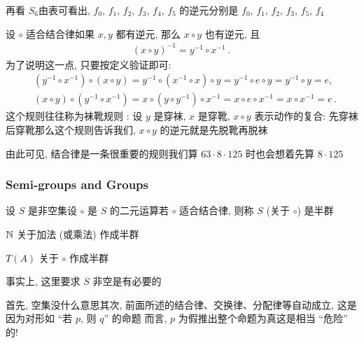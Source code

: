 \begin{example}
    再看 $S_6$\period 由表可看出, $f_0$, $f_1$, $f_2$, $f_3$, $f_4$, $f_5$ 的逆元分别是 $f_0$, $f_1$, $f_2$, $f_3$, $f_5$, $f_4$\period
\end{example}

\begin{remark}
    设 $\circ$ 适合结合律\period 如果 $x,y$ 都有逆元, 那么 $x \circ y$ 也有逆元, 且
    \begin{align*}
        (x \circ y)^{-1} = y^{-1} \circ x^{-1} \period
    \end{align*}
    为了说明这一点, 只要按定义验证即可:
    \begin{align*}
         & (y^{-1} \circ x^{-1}) \circ (x \circ y) = y^{-1} \circ (x^{-1} \circ x) \circ y = y^{-1} \circ e \circ y = y^{-1} \circ y = e,        \\
         & (x \circ y) \circ (y^{-1} \circ x^{-1}) = x \circ (y \circ y^{-1}) \circ x^{-1} = x \circ e \circ x^{-1} = x \circ x^{-1} = e \period
    \end{align*}
    这个规则往往称为袜靴规则 : 设 $y$ 是穿袜, $x$ 是穿靴, $x \circ y$ 表示动作的复合: 先穿袜后穿靴\period 那么这个规则告诉我们, $x \circ y$ 的逆元就是先脱靴再脱袜\period
\end{remark}

\begin{remark}
    由此可见, 结合律是一条很重要的规则\period 我们算 $63 \cdot 8 \cdot 125$ 时也会想着先算 $8 \cdot 125$\period
\end{remark}

\subsubsection*{Semi-groups and Groups}

\begin{definition}
    设 $S$ 是非空集\period 设 $\circ$ 是 $S$ 的二元运算\period 若 $\circ$ 适合结合律, 则称 $S$ (关于 $\circ$) 是半群 \period
\end{definition}

\begin{example}
    $\mathbb{N}$ 关于加法 (或乘法) 作成半群\period
\end{example}

\begin{example}
    $T(A)$ 关于 $\circ$ 作成半群\period
\end{example}

\begin{remark}
    事实上, 这里要求 $S$ 非空是有必要的\period

    首先, 空集没什么意思\period 其次, 前面所述的结合律、交换律、分配律等自动成立, 这是因为对形如 ``若 $p$, 则 $q$'' 的命题  而言, $p$ 为假推出整个命题为真\period 这是相当 ``危险'' 的!
\end{remark}

